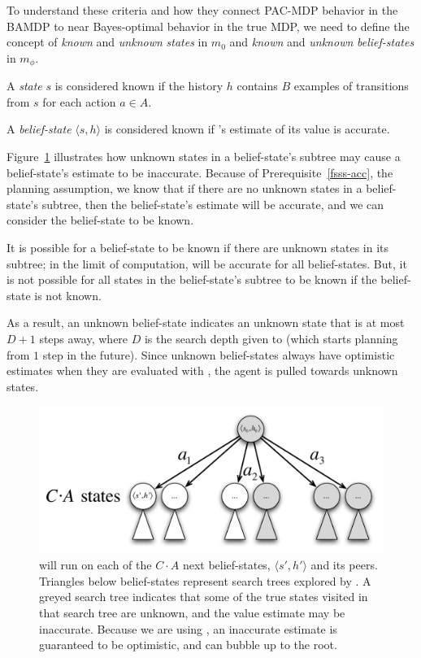 To understand these criteria and how they connect PAC-MDP behavior in the BAMDP to near Bayes-optimal behavior in the true MDP, we need to define the concept of \emph{known} and \emph{unknown} \emph{states} in $m_0$ and  \emph{known} and \emph{unknown} \emph{belief-states} in $m_\phi$.

A \emph{state} $s$ is considered known if the history $h$ contains $B$ examples of transitions from $s$ for each action $a\in A$.

A \emph{belief-state} $\langle s, h \rangle$ is considered known if 's estimate of its value is accurate.

Figure~\ref{fig:bfs3tree} illustrates how unknown states in a belief-state's  subtree may cause a belief-state's estimate to be inaccurate. Because of Prerequisite~\ref{fsss-acc}, the planning assumption, we know that if there are no unknown states in a belief-state's subtree, then the belief-state's estimate will be accurate, and we can consider the belief-state to be known.

It is possible for a belief-state to be known if there are unknown states in its subtree; in the limit of computation,  will be accurate for all belief-states. But, it is not possible for all states in the belief-state's subtree to be known if the belief-state is not known.

As a result, an unknown belief-state indicates an unknown state that is at most $D+1$ steps away, where $D$ is the search depth given to  (which starts planning from $1$ step in the future). Since unknown belief-states always have optimistic estimates when they are evaluated with , the agent is pulled towards unknown states.

\begin{figure}
\vskip 0.2in
\begin{center}
\centerline{\includegraphics[scale=0.5]{figures/bfs3tree}}
\caption{
 will run  on each of the $C\cdot A$ next belief-states, $\langle s', h' \rangle$ and its peers. Triangles below belief-states represent search trees explored by . A greyed search tree indicates that some of the true states visited in that search tree are unknown, and the value estimate may be inaccurate. Because we are using , an inaccurate estimate is guaranteed to be optimistic, and can bubble up to the root.
}
\label{fig:bfs3tree}
\end{center}
\vskip -0.2in
\end{figure} 

